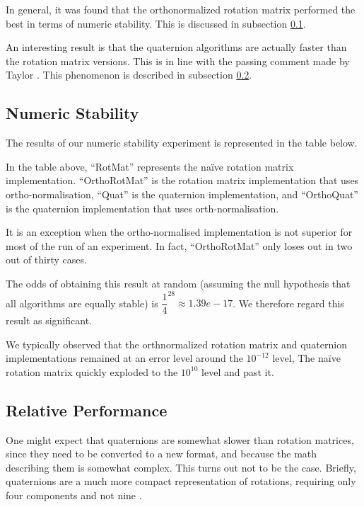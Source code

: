 \documentclass{acm_proc_article-sp}
\begin{document}
In general, it was found that the orthonormalized rotation matrix performed the best in terms of numeric stability.
This is discussed in subsection \ref{sec:stability}.

An interesting result is that the quaternion algorithms are actually faster than the rotation matrix versions.
This is in line with the passing comment made by Taylor \parencite[435]{taylor79}.
This phenomenon is described in subsection \ref{sec:performance}.

\subsection{Numeric Stability}
\label{sec:stability}

The results of our numeric stability experiment is represented in the table below.


In the table above, ``RotMat'' represents the na\"{i}ve rotation matrix implementation. ``OrthoRotMat'' is the rotation matrix implementation that uses ortho-normalisation, ``Quat'' is the quaternion implementation, and ``OrthoQuat'' is the quaternion implementation that uses orth-normalisation.

It is an exception when the ortho-normalised implementation is not superior for most of the run of an experiment.
In fact, ``OrthoRotMat'' only loses out in two out of thirty cases.

The odds of obtaining this result at random (assuming the null hypothesis that all algorithms are equally stable) is $\dfrac{1}{4}^{28} \approx 1.39e-17$.
We therefore regard this result as significant.

We typically observed that the orthnormalized rotation matrix and quaternion implementations remained at an error level around the $10^{-12}$ level, 
The na\"{i}ve rotation matrix quickly exploded to the $10^{10}$ level and past it.

\subsection{Relative Performance}
\label{sec:performance}

One might expect that quaternions are somewhat slower than rotation matrices, since they need to be converted to a new format, and because the math describing them is somewhat complex.
This turns out not to be the case.
Briefly, quaternions are a much more compact representation of rotations, requiring only four components and not nine \parencite[435]{taylor79}.
\end{document}
